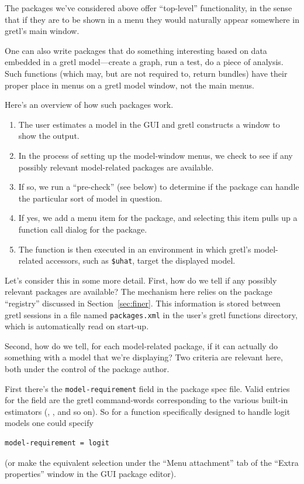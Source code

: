 \documentclass[oneside]{book}
\begin{document}
The packages we've considered above offer ``top-level'' functionality,
in the sense that if they are to be shown in a menu they would
naturally appear somewhere in gretl's main window.

One can also write packages that do something interesting based on
data embedded in a gretl model---create a graph, run a test, do a
piece of analysis. Such functions (which may, but are not required to,
return bundles) have their proper place in menus on a gretl model
window, not the main menus.

Here's an overview of how such packages work.

\begin{enumerate}
\item The user estimates a model in the GUI and gretl constructs a
  window to show the output.
\item In the process of setting up the model-window menus, we check to
  see if any possibly relevant model-related packages are available.
\item If so, we run a ``pre-check'' (see below) to determine
  if the package can handle the particular sort of model in
  question.
\item If yes, we add a menu item for the package, and selecting this
  item pulls up a function call dialog for the package.
\item The function is then executed in an environment in which gretl's
  model-related accessors, such as \verb|$uhat|, target the displayed
  model.%
\end{enumerate}

Let's consider this in some more detail.  First, how do we tell if any
possibly relevant packages are available? The mechanism here relies on
the package ``registry'' discussed in Section~\ref{sec:finer}. This
information is stored between gretl sessions in a file named
\texttt{packages.xml} in the user's gretl functions directory, which
is automatically read on start-up.

Second, how do we tell, for each model-related package, if it can
actually do something with a model that we're displaying? Two criteria
are relevant here, both under the control of the package author.

First there's the \texttt{model-requirement} field in the package
\textsf{spec} file. Valid entries for the field are the gretl
command-words corresponding to the various built-in estimators
(, ,  and so on). So for a function
specifically designed to handle logit models one could specify
\begin{verbatim}
model-requirement = logit
\end{verbatim}
(or make the equivalent selection under the ``Menu attachment'' tab of
the ``Extra properties'' window in the GUI package editor).
\end{document}
